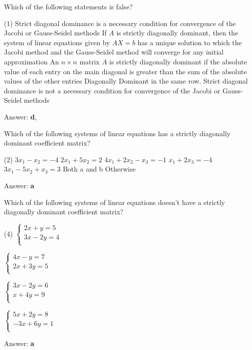 \documentclass{exam}
\begin{document}
\begin{questions}
	\question Which of the following statements is false?
	\begin{tasks}(1)
		\task Strict diagonal dominance is a necessary condition for convergence of the Jacobi or Gauss-Seidel methods
		\task If $A$ is strictly diagonally dominant, then the system of linear equations given by $AX=b$ has a unique solution to which the Jacobi method and the Gauss-Seidel method will converge for any initial approximation
		\task An $n \times n$ matrix $A$ is strictly diagonally dominant if the absolute value of each entry on the main diagonal is greater than the sum of the absolute values of the other entries Diagonally Dominant in the same row.
		\task Strict diagonal dominance is not a necessary condition for convergence of the Jacobi or Gauss-Seidel methods
	\end{tasks}
	Answer: \textbf{d},

	\question Which of the following systems of linear equations has a strictly diagonally dominant coefficient matrix?
	\begin{tasks}(2)
		\task $3x_1 - x_2 = -4$ \newline $2x_1 + 5x_2 = 2$
		\task $4x_1 + 2x_2 - x_3 = -1$ \newline $x_1 + 2x_3 = -4$ \newline $3x_1 - 5x_2 + x_3 = 3$
		\task Both a and b
		\task Otherwise
	\end{tasks}
	Answer: \textbf{a}

	\question Which of the following systems of linear equations doesn't have a strictly diagonally dominant coefficient matrix?
	\begin{tasks}(4)
		\task
		$\begin{cases}
				2x + y = 5  \\
				3x - 2y = 4 \\
			\end{cases}$

		\task
		$\begin{cases}
				4x - y = 7  \\
				2x + 3y = 5 \\
			\end{cases}$

		\task
		$\begin{cases}
				3x - 2y = 6 \\
				x + 4y = 9  \\
			\end{cases}$

		\task
		$\begin{cases}
				5x + 2y = 8  \\
				-3x + 6y = 1 \\
			\end{cases}$
	\end{tasks}
	Answer: \textbf{a}


\end{questions}
\end{document}
